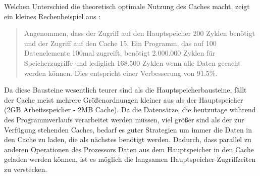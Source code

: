 Welchen Unterschied die theoretisch optimale Nutzung des Caches macht, zeigt ein kleines Rechenbeispiel aus \cite{Drepper07}:

\begin{quotation}
Angenommen, dass der Zugriff auf den Hauptspeicher 200 Zyklen benötigt und der Zugriff auf den Cache 15. Ein Programm, das auf 100 Datenelemente 100mal zugreift, benötigt 2.000.000 Zyklen für Speicherzugriffe und lediglich 168.500 Zyklen wenn alle Daten gecacht werden können. Dies entspricht einer Verbesserung von 91.5\%.
\end{quotation} 

Da diese Bausteine wesentlich teurer sind als die Hauptspeicherbausteine, fällt der Cache meist mehrere Größenordnungen kleiner aus als der Hauptspeicher (2GB Arbeitsspeicher - 2MB Cache). Da die Datensätze, die heutzutage während des Programmverlaufs verarbeitet werden müssen, viel größer sind als der zur Verfügung stehenden Caches, bedarf es guter Strategien um immer die Daten in den Cache zu laden, die als nächstes benötigt werden. Dadurch, dass parallel zu anderen Operationen des Prozessors Daten aus dem Hauptspeicher in den Cache geladen werden können, ist es möglich die langsamen Hauptspeicher-Zugriffzeiten zu verstecken.

